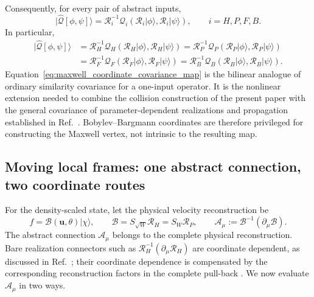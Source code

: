\documentclass[11pt,oneside]{article}
\numberwithin{equation}{section}
\theoremstyle{definition}
\begin{document}
Consequently, for every pair of abstract inputs,
\begin{equation}
|\widehat{\mathcal Q}[\phi,\psi]\rangle
=
\mathcal R_i^{-1}\mathcal Q_i(\mathcal R_i|\phi\rangle,\mathcal R_i|\psi\rangle),
\qquad i=H,P,F,B.
\label{eq:maxwell_abstract_covariance}
\end{equation}
In particular,
\begin{equation}
\begin{aligned}
|\widehat{\mathcal Q}[\phi,\psi]\rangle
&=\mathcal R_H^{-1}\mathcal Q_H(\mathcal R_H|\phi\rangle,\mathcal R_H|\psi\rangle)
=\mathcal R_P^{-1}\mathcal Q_P(\mathcal R_P|\phi\rangle,\mathcal R_P|\psi\rangle)\\
&=\mathcal R_F^{-1}\mathcal Q_F(\mathcal R_F|\phi\rangle,\mathcal R_F|\psi\rangle)
=\mathcal R_B^{-1}\mathcal Q_B(\mathcal R_B|\phi\rangle,\mathcal R_B|\psi\rangle).
\end{aligned}
\label{eq:maxwell_realization_equivalence}
\end{equation}
Equation~\eqref{eq:maxwell_coordinate_covariance_map} is the bilinear analogue of ordinary similarity covariance for a one-input operator.  It is the nonlinear extension needed to combine the collision construction of the present paper with the general covariance of parameter-dependent realizations and propagation established in Ref.~\cite{Karlin2026LFHFock}.  Bobylev--Bargmann coordinates are therefore privileged for constructing the Maxwell vertex, not intrinsic to the resulting map.

\subsection{Moving local frames: one abstract connection, two coordinate routes}
\label{subsec:maxwell_fourier_connection}

For the density-scaled state, let the physical velocity reconstruction be
\begin{equation}
f=\mathcal B(\bm u,\theta)|\chi\rangle,
\qquad
\mathcal B=S_{\sqrt W}\mathcal R_H=S_W\mathcal R_P,
\qquad
\mathcal A_\mu:=\mathcal B^{-1}(\partial_\mu\mathcal B).
\label{eq:maxwell_B_physical}
\end{equation}
The abstract connection $\mathcal A_\mu$ belongs to the complete physical reconstruction.  Bare realization connectors such as $\mathcal R_H^{-1}(\partial_\mu \mathcal R_H)$ are coordinate dependent, as discussed in Ref.~\cite{Karlin2026LFHFock}; their coordinate dependence is compensated by the corresponding reconstruction factors in the complete pull-back \cite{Karlin2026LFHFock}.  We now evaluate $\mathcal A_\mu$ in two ways.
\end{document}
